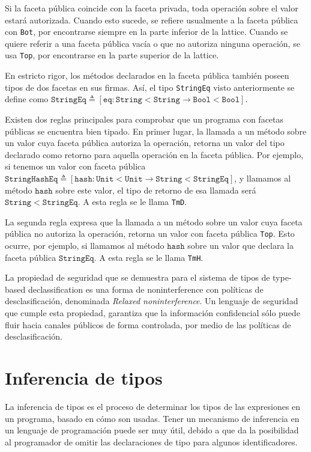 Si la faceta pública coincide con la faceta privada, toda operación sobre el valor estará autorizada. Cuando esto sucede, se refiere usualmente a la faceta pública con \texttt{Bot}, por encontrarse siempre en la parte inferior de la lattice. Cuando se quiere referir a una faceta pública vacía o que no autoriza ninguna operación, se usa \texttt{Top}, por encontrarse en la parte superior de la lattice.

En estricto rigor, los métodos declarados en la faceta pública también poseen tipos de dos facetas en sus firmas. Así, el tipo \texttt{StringEq} visto anteriormente se define como $\mathtt{StringEq} \triangleq [\mathtt{eq} : \mathtt{String<String} \rightarrow \mathtt{Bool<Bool}]$.

Existen dos reglas principales para comprobar que un programa con facetas públicas se encuentra bien tipado. En primer lugar, la llamada a un método sobre un valor cuya faceta pública autoriza la operación, retorna un valor del tipo declarado como retorno para aquella operación en la faceta pública. Por ejemplo, si tenemos un valor con faceta pública $\mathtt{StringHashEq} \triangleq [\mathtt{hash} : \mathtt{Unit<Unit} \rightarrow \mathtt{String<StringEq}]$, y llamamos al método $\mathtt{hash}$ sobre este valor, el tipo de retorno de esa llamada será $\mathtt{String<StringEq}$. A esta regla se le llama \texttt{TmD}.

La segunda regla expresa que la llamada a un método sobre un valor cuya faceta pública no autoriza la operación, retorna un valor con faceta pública \texttt{Top}. Esto ocurre, por ejemplo, si llamamos al método $\mathtt{hash}$ sobre un valor que declara la faceta pública $\mathtt{StringEq}$. A esta regla se le llama \texttt{TmH}.

La propiedad de seguridad que se demuestra para el sistema de tipos de type-based declassification es una forma de noninterference con políticas de desclasificación, denominada \emph{Relaxed noninterference}. Un lenguaje de seguridad que cumple esta propiedad, garantiza que la información confidencial sólo puede fluir hacia canales públicos de forma controlada, por medio de las políticas de desclasificación.

\section{Inferencia de tipos} \label{inference}
La inferencia de tipos es el proceso de determinar los tipos de las expresiones en un programa, basado en cómo son usadas. Tener un mecanismo de inferencia en un lenguaje de programación puede ser muy útil, debido a que da la posibilidad al programador de omitir las declaraciones de tipo para algunos identificadores.

